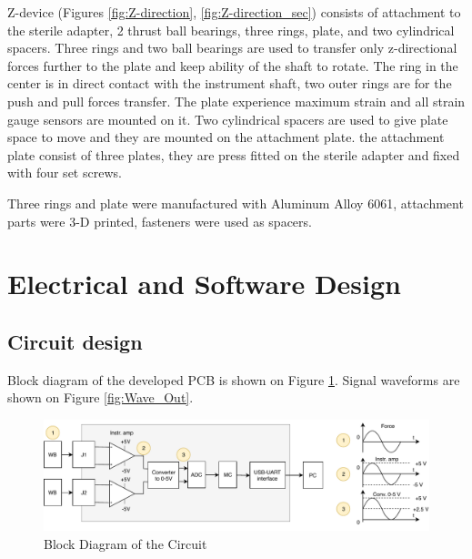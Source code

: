 Z-device (Figures \ref{fig:Z-direction}, \ref{fig:Z-direction_sec}) consists of attachment to the sterile adapter, 2 thrust ball bearings, three rings, plate, and two cylindrical spacers. Three rings and two ball bearings are used to transfer only z-directional forces further to the plate and keep ability of the shaft to rotate. The ring in the center is in direct contact with the instrument shaft, two outer rings are for the push and pull forces transfer. The plate experience maximum strain and all strain gauge sensors are mounted on it.  Two cylindrical spacers are used to give plate space to move and they are mounted on the attachment plate. the attachment plate consist of three plates, they are press fitted on the sterile adapter and fixed with four set screws.

Three rings and plate were manufactured with Aluminum Alloy 6061, attachment parts were 3-D printed, fasteners were used as spacers.


\section{Electrical and Software Design}
\label{sec:elecDes}

	\subsection{Circuit design}
	\label{sec:cirDes}
	Block diagram of the developed PCB is shown on Figure \ref{fig:PCB_block_diag}. Signal waveforms are shown on Figure \ref{fig:Wave_Out}.

\begin{figure}[h]
	\begin{center}
		\includegraphics[width=150mm]{fig/methods/PSC_block_wave.pdf}
	\end{center}
	\vspace{-4mm}
	\caption[Block Diagram of the Circuit]
	{Block Diagram of the Circuit}
	\label{fig:PCB_block_diag}
	\vspace{-2mm}
\end{figure}

